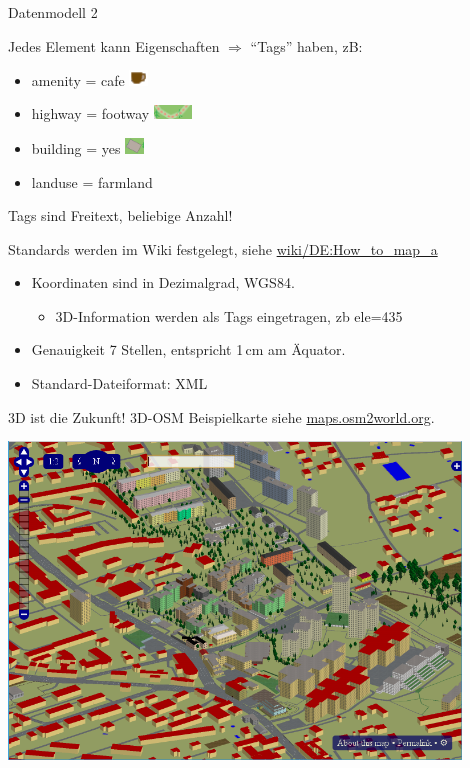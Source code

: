 \documentclass{beamer}
\begin{document}
\begin{frame}{Datenmodell 2}

Jedes Element kann Eigenschaften $\Rightarrow$ ``Tags'' haben, zB:
\begin{itemize}
  \item amenity = cafe \includegraphics[width=0.5cm]{cafe.png}
  \item highway = footway \includegraphics[width=1cm]{footway.png}
  \item building = yes  \includegraphics[width=0.5cm]{building.png}
  \item landuse = farmland
\end{itemize}

Tags sind Freitext, beliebige Anzahl!

Standards werden im Wiki festgelegt, siehe \href{http://wiki.openstreetmap.org/wiki/DE:How\_to\_map\_a}{wiki/DE:How\_to\_map\_a}

\vspace{4mm}
\pause
\begin{itemize}
  \item Koordinaten sind in Dezimalgrad, WGS84. 
	\begin{itemize}
  \item 3D-Information werden als Tags eingetragen, zb ele=435
\end{itemize}
  \item Genauigkeit 7 Stellen, entspricht 1\,cm am Äquator.
  \item Standard-Dateiformat: XML
\end{itemize}

\end{frame}


\begin{frame}{3D ist die Zukunft!}
  3D-OSM Beispielkarte siehe \href{http://maps.osm2world.org/?zoom=17&lat=47.06156&lon=15.46983&layers=BF0FTFFF}{maps.osm2world.org}.

  \includegraphics[width=0.9\textwidth]{3d.png}

\end{frame}
\end{document}
